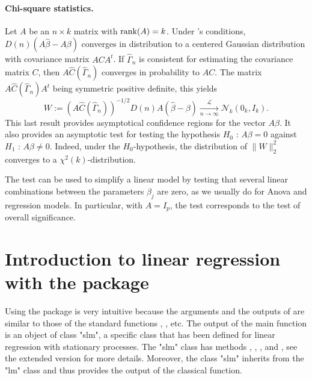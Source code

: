 \paragraph{Chi-square statistics.} Let $A$ be an $n \times k$ matrix with $\rank(A) = k$.
Under \cite{hannan1973central}'s conditions,  $D(n)( A \hat{\beta} - A \beta)$ converges in distribution to a centered Gaussian distribution with covariance matrix $A C A^{t}$. If $\widehat{\Gamma}_{n}$ is consistent for estimating the covariance matrix $C$, then $ A \widehat C (\widehat{\Gamma}_{n})$ converges in probability to $ AC$. The matrix $  A \widehat C (\widehat{\Gamma}_{n}) A^{t} $ being symmetric positive definite, this yields
$$  W := (A \widehat C (\widehat{\Gamma}_{n}) )^{-1/2}  D(n)  A (\hat{\beta} -  \beta)  \xrightarrow[n \rightarrow \infty]{\mathcal{L}} \mathcal{N}_k (0_{k}, I_k) . $$
This last result provides asymptotical confidence regions for the vector $A \beta$. It also provides an asymptotic test for testing the hypothesis $H_0$ : $ A \beta =  0$ against $H_1$ : $ A \beta \neq  0$. Indeed, under the $H_{0}$-hypothesis, the distribution  of $\|W\|_2^2$ converges to a $\chi^{2}(k)$-distribution.

The test can be used to simplify a linear model by testing that several linear combinations between the parameters $\beta_j$ are zero, as we usually do for Anova and regression models. In particular, with $A = I_p$, the test corresponds to the test of overall significance.

\section{Introduction to linear regression with the  package}
\label{sec:slmpackage}

Using the  package is very intuitive because the  arguments and the outputs of  are similar to those of the standard functions , , etc. The output of  the main function  is an object of class "slm", a specific class that has been defined for linear regression with stationary processes. The "slm" class has methods , , , and , see the extended version \cite{caron2019linear} for more details. Moreover, the class "slm" inherits from the "lm" class and thus provides the output of the classical  function.


